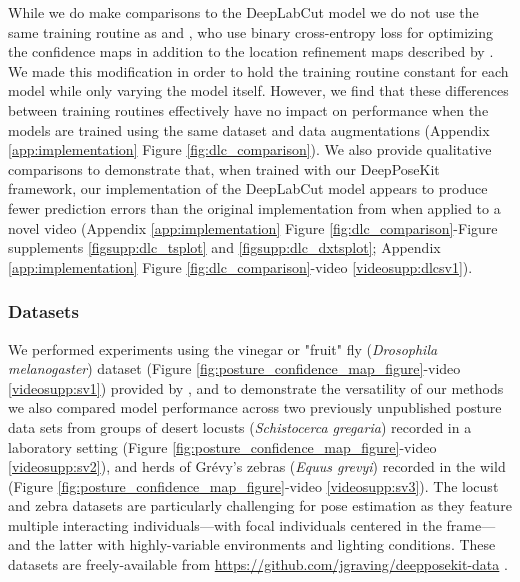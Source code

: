 \documentclass[11pt,a4paper,oneside]{article}
\begin{document}
While we do make comparisons to the DeepLabCut model \citep{mathis2018deeplabcut} we do not use the same training routine as \cite{mathis2018deeplabcut} and \cite{nath2018}, who use binary cross-entropy loss for optimizing the confidence maps in addition to the location refinement maps described by \cite{insafutdinov2016deepercut}. We made this modification in order to hold the training routine constant for each model while only varying the model itself. However, we find that these differences between training routines effectively have no impact on performance when the models are trained using the same dataset and data augmentations (Appendix \ref{app:implementation} Figure \ref{fig:dlc_comparison}). We also provide qualitative comparisons to demonstrate that, when trained with our DeepPoseKit framework, our implementation of the DeepLabCut model \citep{mathis2018deeplabcut} appears to produce fewer prediction errors than the original implementation from \cite{mathis2018deeplabcut, nath2018} when applied to a novel video (Appendix \ref{app:implementation} Figure \ref{fig:dlc_comparison}-Figure supplements \ref{figsupp:dlc_tsplot} and \ref{figsupp:dlc_dxtsplot}; Appendix \ref{app:implementation} Figure \ref{fig:dlc_comparison}-video \ref{videosupp:dlcsv1}). 


\subsubsection{Datasets}
We performed experiments using the vinegar or "fruit" fly (\textit{Drosophila melanogaster}) dataset (Figure \ref{fig:posture_confidence_map_figure}-video \ref{videosupp:sv1}) provided by \cite{pereira2019fast}, and to demonstrate the versatility of our methods we also compared model performance across two previously unpublished posture data sets from groups of desert locusts (\textit{Schistocerca gregaria}) recorded in a laboratory setting (Figure \ref{fig:posture_confidence_map_figure}-video \ref{videosupp:sv2}), and herds of Grévy's zebras (\textit{Equus grevyi}) recorded in the wild (Figure \ref{fig:posture_confidence_map_figure}-video \ref{videosupp:sv3}). The locust and zebra datasets are particularly challenging for pose estimation as they feature multiple interacting individuals—with focal individuals centered in the frame—and the latter with highly-variable environments and lighting conditions. These datasets are freely-available from \url{https://github.com/jgraving/deepposekit-data} \citep{graving2019data}.
\end{document}
